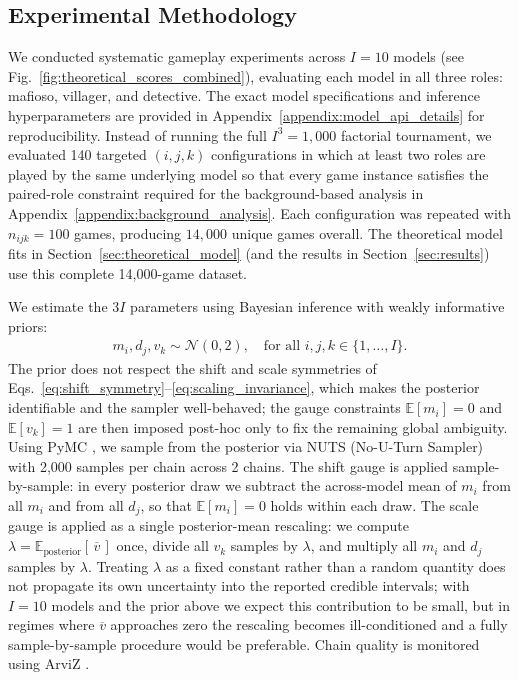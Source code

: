 \documentclass[sigconf]{aamas}
\begin{document}
\subsection{Experimental Methodology}
\label{sec:experimental_methodology}

We conducted systematic gameplay experiments across $I=10$ models (see Fig.~\ref{fig:theoretical_scores_combined}), evaluating each model in all three roles: mafioso, villager, and detective. The exact model specifications and inference hyperparameters are provided in Appendix~\ref{appendix:model_api_details} for reproducibility. Instead of running the full $I^3=1{,}000$ factorial tournament, we evaluated 140 targeted $(i,j,k)$ configurations in which at least two roles are played by the same underlying model so that every game instance satisfies the paired-role constraint required for the background-based analysis in Appendix~\ref{appendix:background_analysis}. Each configuration was repeated with $n_{ijk}=100$ games, producing $14{,}000$ unique games overall. The theoretical model fits in Section~\ref{sec:theoretical_model} (and the results in Section~\ref{sec:results}) use this complete 14,000-game dataset.

We estimate the $3I$ parameters using Bayesian inference with weakly informative priors:
\begin{align}
m_i, d_j, v_k \sim \mathcal{N}(0, 2), \quad \text{for all } i, j, k \in \{1, \ldots, I\}.
\label{eq:bayesian_inference}
\end{align}
The prior does not respect the shift and scale symmetries of Eqs.~\eqref{eq:shift_symmetry}--\eqref{eq:scaling_invariance}, which makes the posterior identifiable and the sampler well-behaved; the gauge constraints $\mathbb{E}[m_i]=0$ and $\mathbb{E}[v_k]=1$ are then imposed post-hoc only to fix the remaining global ambiguity. Using PyMC \citep{pymc2023}, we sample from the posterior via NUTS (No-U-Turn Sampler) with 2,000 samples per chain across 2 chains. The shift gauge is applied sample-by-sample: in every posterior draw we subtract the across-model mean of $m_i$ from all $m_i$ and from all $d_j$, so that $\mathbb{E}[m_i]=0$ holds within each draw. The scale gauge is applied as a single posterior-mean rescaling: we compute $\lambda=\mathbb{E}_{\text{posterior}}\!\left[\,\overline{v}\,\right]$ once, divide all $v_k$ samples by $\lambda$, and multiply all $m_i$ and $d_j$ samples by $\lambda$. Treating $\lambda$ as a fixed constant rather than a random quantity does not propagate its own uncertainty into the reported credible intervals; with $I=10$ models and the prior above we expect this contribution to be small, but in regimes where $\overline{v}$ approaches zero the rescaling becomes ill-conditioned and a fully sample-by-sample procedure would be preferable. Chain quality is monitored using ArviZ \citep{arviz2019}.
\end{document}
